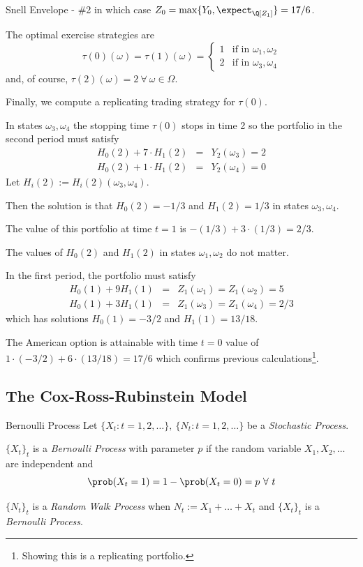 \documentclass[11pt,a4paper]{article}
\begin{document}
\begin{example}{Snell Envelope - \#2}
    in which case $Z_0=\max\{Y_0,\expect_\Q[Z_1]\}=17/6$.
    \par The optimal exercise strategies are
    \[ \tau(0)(\omega)=\tau(1)(\omega)=\begin{cases}
      1&\text{if in }\omega_1,\omega_2\\
      2&\text{if in }\omega_3,\omega_4
    \end{cases} \]
    and, of course, $\tau(2)(\omega)=2\ \forall\ \omega\in\Omega$.
    \par Finally, we compute a replicating trading strategy for $\tau(0)$.
    \par In states $\omega_3,\omega_4$ the stopping time $\tau(0)$ stops in time 2 so the portfolio in the second period must satisfy
    \[\begin{array}{rcl}
      H_0(2)+7\cdot H_1(2)&=&Y_2(\omega_3)=2\\
      H_0(2)+1\cdot H_1(2)&=&Y_2(\omega_4)=0
    \end{array}\]
    Let $H_i(2):=H_i(2)(\omega_3,\omega_4)$.
    \par Then the solution is that $H_0(2)=-1/3$ and $H_1(2)=1/3$ in states $\omega_3,\omega_4$.
    \par The value of this portfolio at time $t=1$ is $-(1/3)+3\cdot(1/3)=2/3$.
    \par The values of $H_0(2)$ and $H_1(2)$ in states $\omega_1,\omega_2$ do not matter.
    \par In the first period, the portfolio must satisfy
    \[\begin{array}{rcl}
      H_0(1)+9H_1(1)&=&Z_1(\omega_1)=Z_1(\omega_2)=5\\
      H_0(1)+3H_1(1)&=&Z_1(\omega_3)=Z_1(\omega_4)=2/3
    \end{array}\]
    which has solutions $H_0(1)=-3/2$ and $H_1(1)=13/18$.
    \par The American option is attainable with time $t=0$ value of $1\cdot(-3/2)+6\cdot(13/18)=17/6$ which confirms previous calculations\footnote{Showing this is a replicating portfolio.}.
  \end{example}

\subsection{The Cox-Ross-Rubinstein Model}

  \begin{definition}{Bernoulli Process}
    Let $\{X_t:t=1,2,\dots\},\ \{N_t:t=1,2,\dots\}$ be a \textit{Stochastic Process}.
    \par $\{X_t\}_t$ is a \textit{Bernoulli Process} with parameter $p$ if the random variable $X_1,X_2,\dots$ are independent and
    \[ \prob(X_t=1)=1-\prob(X_t=0)=p\ \forall\ t \]
    \par $\{N_t\}_t$ is a \textit{Random Walk Process} when $N_t:=X_1+\dots+X_t$ and $\{X_t\}_t$ is a \textit{Bernoulli Process}.
  \end{definition}
\end{document}
